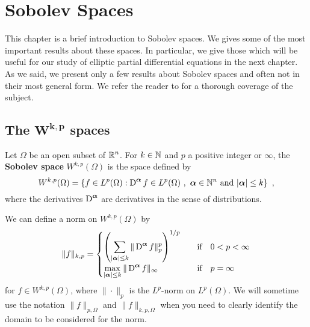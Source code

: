 \chapter{Sobolev Spaces} \label{sobolev_chap}

This chapter is a brief introduction to Sobolev spaces.  We gives some
of the most important results about these spaces.  In particular, we
give those which will be useful for our study of elliptic partial
differential equations in the next chapter.  As we said, we present only a
few results about Sobolev spaces and often not in their most general
form.  We refer the reader to \cite{Ad} for a thorough coverage of the
subject.

\section{The $\displaystyle \mathbf{W^{k,p}}$
spaces} \label{sobolev_def}

\begin{defn} \label{sob_1st_wkp}
Let $\Omega$ be an open subset of $\displaystyle \mathbb{R}^n$.  For $k\in \mathbb{N}$ and
$p$ a positive integer or $\infty$, the
{\bfseries Sobolev space}
$\displaystyle W^{k,p}(\Omega)$ is the space defined by
\[
W^{k,p}(\Omega) = \left\{ f \in L^p(\Omega) : \operatorname{D}^{{\bm{\alpha}}} f \in
L^p(\Omega) \ , \ {\bm{\alpha}} \in \mathbb{N}^n \ \text{and}
\ |{\bm{\alpha}}| \leq k \right\} \ ,
\]
where the derivatives $\displaystyle \operatorname{D}^{{\bm{\alpha}}}$ are derivatives in
the sense of distributions.
\end{defn}

We can define a norm on $\displaystyle W^{k,p}(\Omega)$ by
\begin{equation} \label{sob_norm_wkp}
\| f \|_{k,p} =
\begin{cases}
\displaystyle \left( \sum_{|{\bm{\alpha}}|\leq k} \|
\operatorname{D}^{{\bm{\alpha}}} f \|_p^p \right)^{1/p}&
\quad \text{if} \quad 0 < p < \infty \\
\displaystyle \max_{|{\bm{\alpha}}|\leq k} \| \operatorname{D}^{{\bm{\alpha}}} f \|_\infty &
\quad \text{if} \quad p = \infty
\end{cases}
\end{equation}
for $\displaystyle f \in W^{k,p}(\Omega)$, where $\|\cdot\|_p$ is the
$\displaystyle L^p$-norm on $\displaystyle L^p(\Omega)$.
We will sometime use the notation $\|f\|_{p,\Omega}$ and
$\|f\|_{k,p,\Omega}$ when you
need to clearly identify the domain to be considered for the norm.

